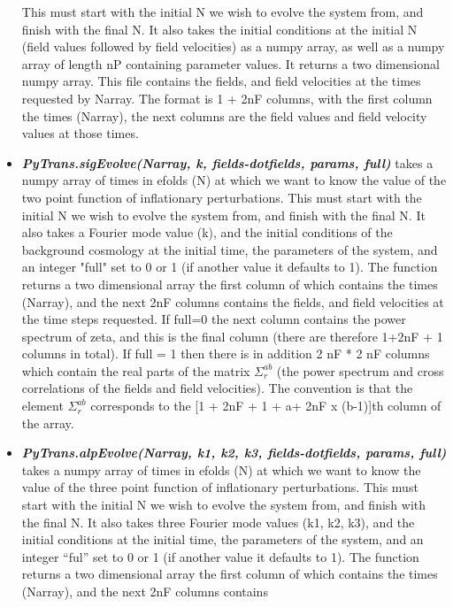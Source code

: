 \documentclass[10pt,
amsmath,amssymb,
aps,prd,nofootinbib,eqsecnum,a4paper]{revtex4}
\begin{document}
\begin{itemize}
    This must start with the initial N we wish to evolve the system from, and finish with the 
    final N. It also takes the initial conditions at the initial N (field values followed by 
    field velocities) as a numpy array, as well as 
    a numpy array of length nP  containing parameter values.  It returns a two dimensional numpy array. 
    This file contains the fields, and field velocities at the times requested by 
    Narray. The format is 1 + 2nF columns, with the first column the times (Narray), the next 
    columns are the field values and field velocity values at those times. 
\item  {\it \bf PyTrans.sigEvolve(Narray, k, fields-dotfields, params, full)} takes a numpy array of times in efolds (N) 
    at which we want to know the value of the two point function of inflationary perturbations. 
    This must start with the initial N we wish to evolve the system from, and finish with the 
    final N. It also takes a Fourier mode value 
    (k), and the initial conditions of the background cosmology at the initial time, the parameters of the system, 
    and an integer "full" set to 0 or 1 
    (if another value it defaults to 1). The function returns a two dimensional array 
     the first column of which contains the times (Narray), and the next 2nF  columns contains 
     the fields, and field velocities at the time steps requested. If full=0 the next column contains the power spectrum 
     of zeta, and this is the final column 
     (there are therefore 1+2nF + 1 columns in total).
     If full = 1 then there is in addition 2 nF * 2 nF columns which contain the  real parts of the matrix $\Sigma_r^{ab}$ (the power 
     spectrum and cross correlations of the fields and field velocities). 
  	The convention is that the element $\Sigma_r^{ab}$ corresponds to the [1 + 2nF + 1 + a+ 
    2nF x (b-1)]th column of the array. 
\item  {\it \bf PyTrans.alpEvolve(Narray, k1, k2, k3, fields-dotfields, params, full)} takes a numpy array of times in efolds (N) 
    at which we want to know the value of the three point function of inflationary perturbations. 
    This must start with the initial N we wish to evolve the system from, and finish with the 
    final N. It also takes three Fourier mode values 
    (k1, k2, k3), and the initial conditions at the initial time, the parameters of the system, 
    and an integer ``ful'' set to 0 or 1 
    (if another value it defaults to 1). 
    The function returns a two dimensional array 
     the first column of which contains the times (Narray), and the next 2nF  columns contains 

\end{itemize}
\end{document}
